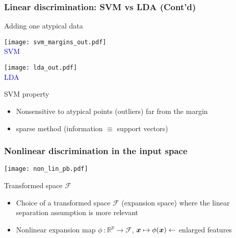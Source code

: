 \begin{frame}
  \frametitle{Linear discrimination:  SVM vs LDA (Cont'd)}

\begin{block}{Adding one atypical data}
\end{block}


\begin{minipage}{0.35\textwidth}
\begin{center}
\texttt{[image: svm\_margins\_out.pdf]}\\
\textcolor{blue}{SVM}
\end{center}
\end{minipage}
\hfill
\begin{minipage}{0.35\textwidth}
\begin{center}
\texttt{[image: lda\_out.pdf]}\\
\textcolor{blue}{LDA}
\end{center}
\end{minipage}

  \begin{block}{SVM property}
   \begin{itemize}
    \item Nonsensitive to atypical points (outliers) far from the margin
    \item[\doigt] sparse method (information $\equiv$ support vectors)
   \end{itemize}
  \end{block}

\end{frame}

\begin{frame}
  \frametitle{Nonlinear discrimination in the input space}


\begin{center}
\texttt{[image: non\_lin\_pb.pdf]}
\end{center}

\begin{block}{Transformed space $\mathcal{F}$}
\begin{itemize}
   \item Choice of a transformed space  $\mathcal{F}$ (expansion space) where
   the linear separation assumption is more relevant
   \item Nonlinear expansion map $\phi~: \mathbb{R}^p \rightarrow \mathcal{F} $, ${\boldsymbol{x}}\mapsto \phi({\boldsymbol{x}})\leftarrow$ enlarged features
\end{itemize}


\end{block}


\end{frame}

